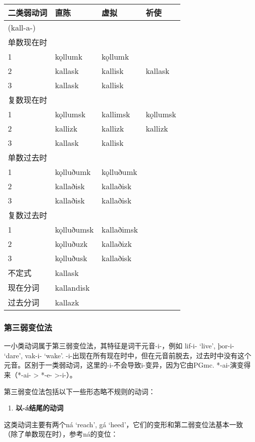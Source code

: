 \begin{longtable}{llll}
\toprule
二类弱动词 & 直陈 & 虚拟 & 祈使 \\
\midrule
\endhead
\bottomrule
\endfoot
(kall-a-) & & & \\
单数现在时 & & & \\
1 & kǫllumk & kǫllumk & \\
2 & kallask & kallisk & kallask \\
3 & kallask & kallisk & \\
复数现在时 & & & \\
1 & kǫllumsk & kallimsk & kǫllumsk \\
2 & kallizk & kallizk & kallizk \\
3 & kallask & kallisk & \\
单数过去时 & & & \\
1 & kǫlluðumk & kǫlluðumk & \\
2 & kallaðisk & kallaðisk & \\
3 & kallaðisk & kallaðisk & \\
复数过去时 & & & \\
1 & kǫlluðumsk & kallaðimsk & \\
2 & kǫlluðuzk & kallaðizk & \\
3 & kǫlluðusk & kallaðisk & \\
不定式 & kallask & & \\
现在分词 & kallandisk & & \\
过去分词 & kallazk & & \\
\end{longtable}

\subsubsection{第三弱变位法}\label{ux7b2cux4e09ux5f31ux53d8ux4f4dux6cd5}

一小类动词属于第三弱变位法，其特征是词干元音-i-，例如 lif-i- `live‌',
þor-i- `dare‌', vak-i- `wake‌'.
-i-出现在所有现在时中，但在元音前脱去，过去时中没有这个元音。区别于一类弱动词，这里的-i-不会导致i-变异，因为它由PGmc.
*-ai-演变得来（*-ai- \textgreater{} *-e- \textgreater-i-）。

第三弱变位法包括以下一些形态略不规则的动词：

\begin{enumerate}
\def\labelenumi{\arabic{enumi})}
\item
  \textbf{以-á结尾的动词}
\end{enumerate}

这类动词主要有两个ná `reach', gá
`heed'，它们的变形和第二弱变位法基本一致（除了单数现在时），参考ná的变位：

